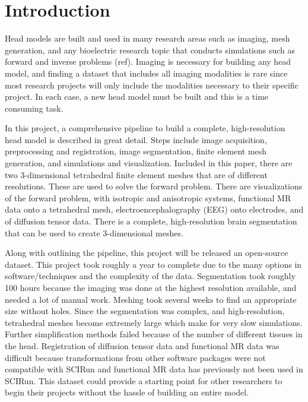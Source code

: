 
\section{Introduction}
\label{sec:intro}

Head models are built and used in many research areas such as imaging, mesh generation, and any bioelectric research topic that conducts simulations such as forward and inverse problems (ref). Imaging is necessary for building any head model, and finding a dataset that includes all imaging modalities is rare since most research projects will only include the modalities necessary to their specific project. In each case, a new head model must be built and this is a time consuming task.

In this project, a comprehensive pipeline to build a complete, high-resolution head model is described in great detail. Steps include image acquisition, preprocessing and registration, image segmentation, finite element mesh generation, and simulations and visualization. Included in this paper, there are two 3-dimensional tetrahedral finite element meshes that are of different resolutions. These are used to solve the forward problem. There are visualizations of the forward problem, with isotropic and anisotropic systems, functional MR data onto a tetrahedral mesh, electroencephalography (EEG) onto electrodes, and of diffusion tensor data. There is a complete, high-resolution brain segmentation that can be used to create 3-dimensional meshes. 

Along with outlining the pipeline, this project will be released an open-source dataset. This project took roughly a year to complete due to the many options in software/techniques and the complexity of the data. Segmentation took roughly 100 hours because the imaging was done at the highest resolution available, and needed a lot of manual work. Meshing took several weeks to find an appropriate size without holes. Since the segmentation was complex, and high-resolution, tetrahedral meshes become extremely large which make for very slow simulations. Further simplification methods failed because of the number of different tissues in the head. Registration of diffusion tensor data and functional MR data was difficult because transformations from other software packages were not compatible with SCIRun and functional MR data has previously not been used in SCIRun. This dataset could provide a starting point for other researchers to begin their projects without the hassle of building an entire model. 
